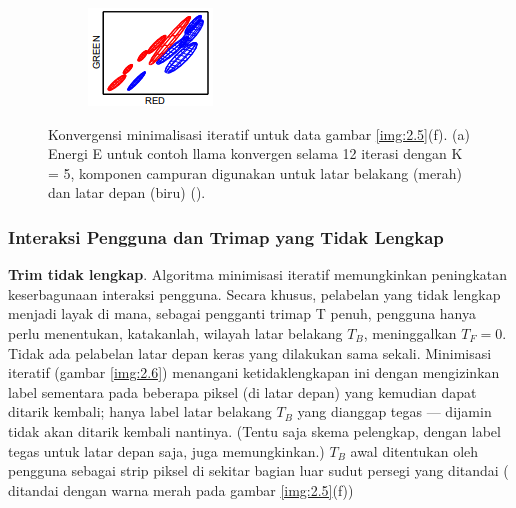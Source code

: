 \begin{figure}[H]
    \begin{subfigure}{0.3\textwidth}
      \centering{}
      \includegraphics[width=\textwidth]{gambar/gambar-2_7(c).png}
      \caption{}
    \end{subfigure}  
  \caption{
    Konvergensi minimalisasi iteratif untuk data gambar \ref{img:2.5}(f). (a) Energi E untuk contoh 
    llama konvergen selama 12 iterasi dengan K = 5, komponen campuran digunakan untuk latar belakang (merah) dan latar depan (biru) (\cite{Rother:2004}). 
    }
    \label{img:2.7}
\end{figure}

\subsubsection{{Interaksi Pengguna dan Trimap yang Tidak Lengkap}}

\textbf{Trim tidak lengkap}. Algoritma minimisasi iteratif memungkinkan peningkatan 
keserbagunaan interaksi pengguna. Secara khusus, pelabelan yang tidak lengkap menjadi 
layak di mana, sebagai pengganti trimap T penuh, pengguna hanya perlu menentukan, 
katakanlah, wilayah latar belakang \(T_{B}\), meninggalkan \(T_{F} = 0\). Tidak ada pelabelan latar 
depan keras yang dilakukan sama sekali. Minimisasi iteratif (gambar \ref{img:2.6}) menangani 
ketidaklengkapan ini dengan mengizinkan label sementara pada beberapa piksel (di 
latar depan) yang kemudian dapat ditarik kembali; hanya label latar belakang \(T_{B}\) 
yang dianggap tegas — dijamin tidak akan ditarik kembali nantinya. (Tentu saja 
skema pelengkap, dengan label tegas untuk latar depan saja, juga memungkinkan.) 
\(T_{B}\) awal ditentukan oleh pengguna sebagai strip piksel di sekitar bagian 
luar sudut persegi yang ditandai ( ditandai dengan warna merah pada gambar \ref{img:2.5}(f))

